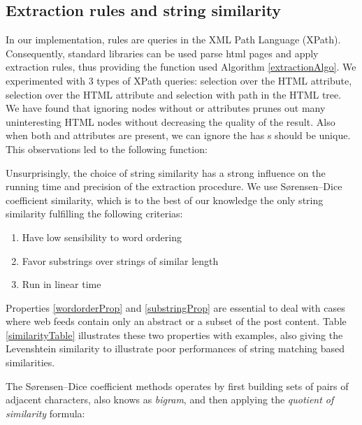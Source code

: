 \subsection{Extraction rules and string similarity}
In our implementation, rules are queries in the XML Path Language (XPath). Consequently, standard libraries can be used parse html pages and apply extraction rules, thus providing the  function used Algorithm \ref{extractionAlgo}. We experimented with 3 types of XPath queries: selection over the HTML  attribute, selection over the HTML  attribute and selection with path in the HTML tree. We have found that ignoring nodes without  or  attributes prunes out many uninteresting HTML nodes without decreasing  the quality of the result. Also when both  and  attributes are present, we can ignore the  has s should be unique. This observations led to the following  function:

\allrulesAlgo

Unsurprisingly, the choice of string similarity has a strong influence on the running time and precision of the extraction procedure. We use Sørensen–Dice coefficient similarity\cite{dice1945}, which is to the best of our knowledge the only string similarity fulfilling the following criterias:

\begin{enumerate}
  \item\label{wordorderProp} Have low sensibility to word ordering
  \item\label{substringProp} Favor substrings over strings of similar length
  \item\label{linearProp} Run in linear time
\end{enumerate}

Properties \ref{wordorderProp} and \ref{substringProp} are essential to deal with cases where web feeds contain only an abstract or a subset of the post content. Table \ref{similarityTable} illustrates these two properties with examples, also giving the Levenshtein\cite{levenshtein1966} similarity to illustrate poor performances of string matching based similarities.

\similarityTable

The Sørensen–Dice coefficient methods operates by first building sets of pairs of adjacent characters, also knows as \emph{bigram}, and then applying the \emph{quotient of similarity} formula:

